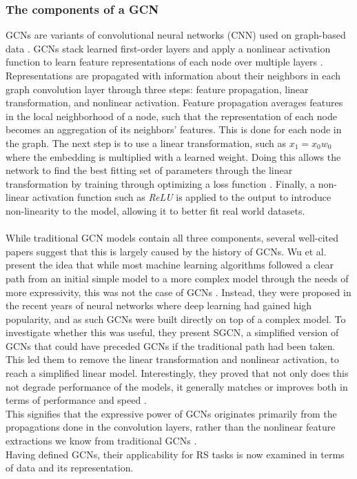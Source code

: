 \subsubsection*{The components of a GCN}
GCNs are variants of convolutional neural networks (CNN) used on graph-based data \cite{KOrderConnectivity}.
GCNs stack learned first-order layers and apply a nonlinear activation function to learn feature representations of each node over multiple layers \cite{KOrderConnectivity}.
Representations are propagated with information about their neighbors in each graph convolution layer through three steps: feature propagation, linear transformation, and nonlinear activation.
Feature propagation averages features in the local neighborhood of a node, such that the representation of each node becomes an aggregation of its neighbors' features.
This is done for each node in the graph.
The next step is to use a linear transformation, such as $x_1 = x_0w_0$ where the embedding is multiplied with a learned weight.
Doing this allows the network to find the best fitting set of parameters through the linear transformation by training through optimizing a loss function \cite{RecentConvNets}.
Finally, a non-linear activation function such as \textit{ReLU} is applied to the output to introduce non-linearity to the model, allowing it to better fit real world datasets.
\\\\
While traditional GCN models contain all three components, several well-cited papers \cite{SimplifyingGCN,LightGCN,HeteGCN} suggest that this is largely caused by the history of GCNs.
Wu et al. present the idea that while most machine learning algorithms followed a clear path from an initial simple model to a more complex model through the needs of more expressivity, this was not the case of GCNs \cite{SimplifyingGCN}.
Instead, they were proposed in the recent years of neural networks where deep learning had gained high popularity, and as such GCNs were built directly on top of a complex model.
To investigate whether this was useful, they present SGCN, a simplified version of GCNs that could have preceded GCNs if the traditional path had been taken.
This led them to remove the linear transformation and nonlinear activation, to reach a simplified linear model.
Interestingly, they proved that not only does this not degrade performance of the models, it generally matches or improves both in terms of performance and speed \cite{SimplifyingGCN}.\\
This signifies that the expressive power of GCNs originates primarily from the propagations done in the convolution layers, rather than the nonlinear feature extractions we know from traditional GCNs \cite{SimplifyingGCN}.
\\
Having defined GCNs, their applicability for RS tasks is now examined in terms of data and its representation.

